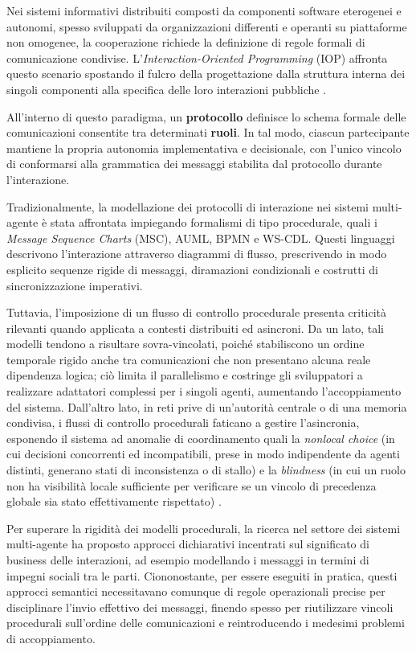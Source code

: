 Nei sistemi informativi distribuiti composti da componenti software eterogenei e autonomi, 
spesso sviluppati da organizzazioni differenti e operanti su piattaforme non omogenee, la 
cooperazione richiede la definizione di regole formali di comunicazione condivise. 
L'\emph{Interaction-Oriented Programming} (IOP) affronta questo scenario spostando il fulcro 
della progettazione dalla struttura interna dei singoli componenti alla specifica delle 
loro interazioni pubbliche \autocite{singh2011bspl}.

All'interno di questo paradigma, un \textbf{protocollo} definisce lo schema formale delle 
comunicazioni consentite tra determinati \textbf{ruoli}. In tal modo, ciascun partecipante 
mantiene la propria autonomia implementativa e decisionale, con l'unico vincolo di conformarsi 
alla grammatica dei messaggi stabilita dal protocollo durante l'interazione.

Tradizionalmente, la modellazione dei protocolli di interazione nei sistemi multi-agente è 
stata affrontata impiegando formalismi di tipo procedurale, quali i \emph{Message Sequence 
Charts} (MSC), AUML, BPMN e WS-CDL. Questi linguaggi descrivono l'interazione attraverso diagrammi 
di flusso, prescrivendo in modo esplicito sequenze rigide di messaggi, 
diramazioni condizionali e costrutti di sincronizzazione imperativi.

Tuttavia, l'imposizione di un flusso di controllo procedurale presenta criticità rilevanti 
quando applicata a contesti distribuiti ed asincroni. Da un lato, tali modelli tendono a 
risultare sovra-vincolati, poiché stabiliscono un ordine temporale 
rigido anche tra comunicazioni che non presentano alcuna reale dipendenza logica; ciò limita 
il parallelismo e costringe gli sviluppatori a realizzare adattatori complessi per i singoli 
agenti, aumentando l'accoppiamento del sistema. Dall'altro lato, in reti prive di un'autorità 
centrale o di una memoria condivisa, i flussi di controllo procedurali faticano a gestire 
l'asincronia, esponendo il sistema ad anomalie di coordinamento quali la \emph{nonlocal choice} 
(in cui decisioni concorrenti ed incompatibili, prese in modo indipendente da agenti distinti, 
generano stati di inconsistenza o di stallo) e la \emph{blindness} (in cui un ruolo non ha 
visibilità locale sufficiente per verificare se un vincolo di precedenza globale sia stato 
effettivamente rispettato) \autocite{singh2011lost}.

Per superare la rigidità dei modelli procedurali, la ricerca nel settore dei sistemi 
multi-agente ha proposto approcci dichiarativi incentrati sul significato di business delle 
interazioni, ad esempio modellando i messaggi in termini di impegni sociali 
tra le parti. Ciononostante, per essere eseguiti in pratica, questi approcci semantici 
necessitavano comunque di regole operazionali precise per disciplinare l'invio effettivo dei 
messaggi, finendo spesso per riutilizzare vincoli procedurali sull'ordine delle comunicazioni e 
reintroducendo i medesimi problemi di accoppiamento.


